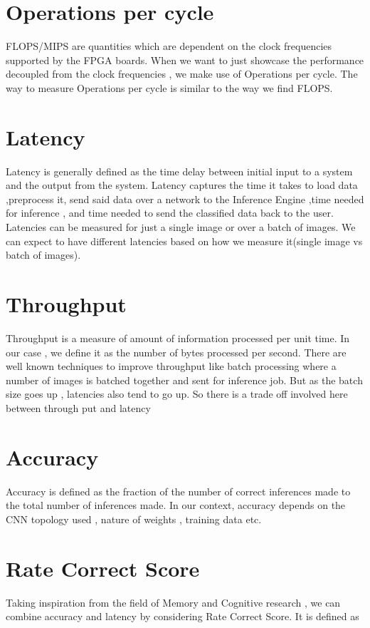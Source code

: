 \documentclass[titlepage]{report}
\begin{document}
\section{Operations per cycle}
FLOPS/MIPS are quantities which are dependent on the clock frequencies supported by the FPGA boards.
When we want to just showcase the performance decoupled from the clock frequencies , we make use of Operations per cycle.
The way to measure Operations per cycle is similar to the way we find FLOPS. 

\section{Latency}
Latency is generally defined as the time delay between initial input to a system and the output from the system.
Latency captures the time it takes to load  data ,preprocess it, send said data over a network to the Inference Engine ,time needed for inference , and time needed to send the classified data back to the user.
Latencies can be measured for just a single image or over a batch of images. We can expect to have different latencies based on how we measure it(single image vs batch of images).

\section{Throughput}
Throughput is  a measure of amount of information processed per unit time. In our case , we define it as the number of bytes processed per second.
There are well known techniques to improve throughput like batch processing where a number of images is batched together and sent for inference job.
But as the batch size goes up , latencies also tend to go up. So there is a trade off involved here between through put and latency

\section{Accuracy}
Accuracy is defined as the fraction of the number of correct inferences made to the total number of inferences made.
In our context, accuracy depends on the CNN topology used , nature of weights , training data etc.


\section{Rate Correct Score}
Taking inspiration from the field of Memory and  Cognitive research , we can combine accuracy and latency by considering Rate Correct Score. It is defined as    
\end{document}
